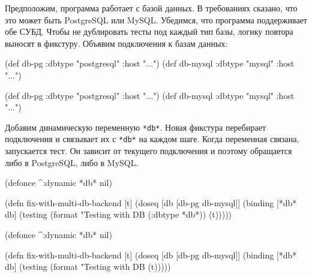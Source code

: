 Предположим, программа работает с базой данных. В требованиях сказано, что это
может быть PostgreSQL или MySQL. Убедимся, что программа поддерживает обе
СУБД. Чтобы не дублировать тесты под каждый тип базы, логику повтора выносят в
фикстуру. Объявим подключения к базам данных:

\ifx\devicetype\mobile

\begin{english}
  \begin{clojure}
(def db-pg
  {:dbtype "postgresql" :host "..."})
(def db-mysql
  {:dbtype "mysql"      :host "..."})
  \end{clojure}
\end{english}

\else

\begin{english}
  \begin{clojure}
(def db-pg    {:dbtype "postgresql" :host "..."})
(def db-mysql {:dbtype "mysql"      :host "..."})
  \end{clojure}
\end{english}

\fi

Добавим динамическую переменную \verb|*db*|. Новая фикстура перебирает
подключения и связывает их с \verb|*db*| на каждом шаге. Когда переменная
связана, запускается тест. Он зависит от текущего подключения и поэтому
обращается либо в PostgreSQL, либо в MySQL.

\ifx\devicetype\mobile

\begin{english}
  \begin{clojure}
(defonce ^:dynamic *db* nil)

(defn fix-with-multi-db-backend [t]
  (doseq [db [db-pg db-mysql]]
    (binding [*db* db]
      (testing
        (format "Testing with DB %
          (:dbtype *db*))
        (t)))))
  \end{clojure}
\end{english}

\else

\begin{english}
  \begin{clojure}
(defonce ^:dynamic *db* nil)

(defn fix-with-multi-db-backend [t]
  (doseq [db [db-pg db-mysql]]
    (binding [*db* db]
      (testing (format "Testing with DB %
        (t)))))
  \end{clojure}
\end{english}

